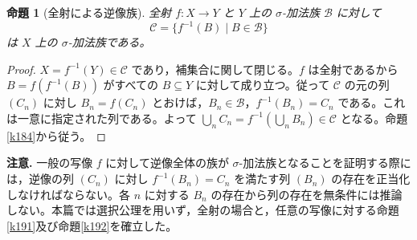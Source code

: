 \documentclass[a5paper,10pt,dvipdfmx]{jsarticle}
\theoremstyle{definition}
\theoremstyle{plain}
\newtheorem{prop}[ruledef]{命題}
\begin{document}
\begin{prop}[全射による逆像族]\label{k193}
全射 $f\colon X\to Y$ と $Y$ 上の $\sigma$-加法族 $\mathcal B$ に対して
\[\mathcal C=\{f^{-1}(B)\mid B\in\mathcal B\}\]
は $X$ 上の $\sigma$-加法族である。
\end{prop}
\begin{proof}
$X=f^{-1}(Y)\in\mathcal C$ であり，補集合に関して閉じる。$f$ は全射であるから $B=f(f^{-1}(B))$ がすべての $B\subseteq Y$ に対して成り立つ。従って $\mathcal C$ の元の列 $(C_n)$ に対し $B_n=f(C_n)$ とおけば，$B_n\in\mathcal B$，$f^{-1}(B_n)=C_n$ である。これは一意に指定された列である。よって $\bigcup_n C_n=f^{-1}(\bigcup_n B_n)\in\mathcal C$ となる。命題\ref{k184}から従う。
\end{proof}
\par\noindent\textbf{注意.} 一般の写像 $f$ に対して逆像全体の族が $\sigma$-加法族となることを証明する際には，逆像の列 $(C_n)$ に対し $f^{-1}(B_n)=C_n$ を満たす列 $(B_n)$ の存在を正当化しなければならない。各 $n$ に対する $B_n$ の存在から列の存在を無条件には推論しない。本篇では選択公理を用いず，全射の場合と，任意の写像に対する命題\ref{k191}及び命題\ref{k192}を確立した。
\par\medskip{}
\end{document}
